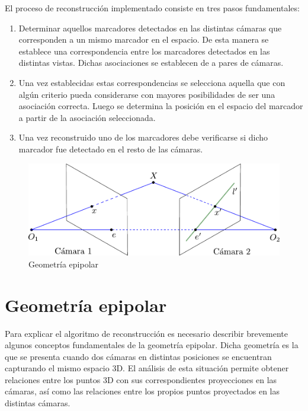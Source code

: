 El proceso de reconstrucción implementado consiste en tres pasos fundamentales:
\begin{enumerate}
\item Determinar aquellos marcadores detectados en las distintas cámaras que corresponden a un mismo marcador en el espacio. De esta manera se establece una correspondencia entre los marcadores detectados en las distintas vistas. Dichas asociaciones se establecen de a pares de cámaras.
\item Una vez establecidas estas correspondencias se selecciona aquella que con algún criterio pueda considerarse con mayores posibilidades de ser una asociación correcta. Luego se determina la posición en el espacio del marcador a partir de la asociación seleccionada.
\item Una vez reconstruido uno de los marcadores debe verificarse si dicho marcador fue detectado en el resto de las cámaras.
\end{enumerate}
\begin{figure}[H]
\begin{center}
\includegraphics[scale=0.7]{img/Reconstruccion/geometria_epipolar}
\end{center}
\caption{Geometría epipolar}
\label{fig: geometria_epipolar}
\end{figure}

\section{Geometría epipolar}



Para explicar el algoritmo de reconstrucción es necesario describir brevemente algunos conceptos fundamentales de la geometría epipolar.  Dicha geometría es la que se presenta cuando dos cámaras en distintas posiciones se encuentran capturando el mismo espacio 3D. El análisis de esta situación permite obtener relaciones entre los puntos 3D con sus correspondientes proyecciones en las cámaras, así como las relaciones entre los propios puntos proyectados en las distintas cámaras\cite{cyganek}\cite{hartley}. \\

